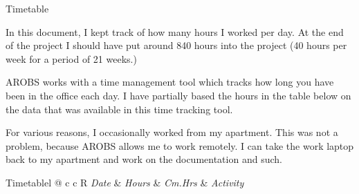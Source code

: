 \documentclass{matthijs}
\begin{document}

	\thispagestyle{empty}

	\begin{hoofdstuk}{Timetable}

		In this document, I kept track of how many hours I worked per day.
		At the end of the project I should have put around 840 hours into the project (40 hours per week for a period of 21 weeks.)
		
		\bigskip

		AROBS works with a time management tool which tracks how long you have been in the office each day.
		I have partially based the hours in the table below on the data that was available in this time tracking tool.
		
		\bigskip

		For various reasons, I occasionally worked from my apartment.
		This was not a problem, because AROBS allows me to work remotely.
		I can take the work laptop back to my apartment and work on the documentation and such.

		\bigskip

		\begin{tabel}{Timetable}{l @{\extracolsep{\fill}} c c R}
			\emph{Date} & \emph{Hours} & \emph{Cm.Hrs} & \emph{Activity} \\
			\midrule


\end{tabel}
\end{hoofdstuk}
\end{document}
